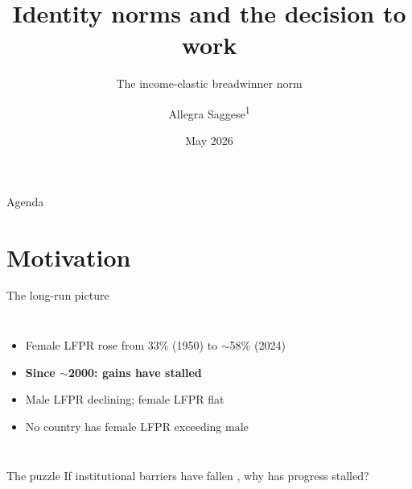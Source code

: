 \documentclass[10pt,aspectratio=169]{beamer}
\title[Identity norms \& work]{Identity norms and the decision to work}
\subtitle{The income-elastic breadwinner norm}
\author[Saggese]{Allegra Saggese\textsuperscript{1}}
\institute{\textsuperscript{1}UC Santa Cruz}
\date[May 2026]{May 2026}
\begin{document}

\maketitle

\begin{frame}[toc]{Agenda}
  \tableofcontents
\end{frame}

\section{Motivation}

\begin{frame}{The long-run picture}
  \begin{columns}[c]
      \begin{itemize}
        \item Female LFPR rose from 33\% (1950) to $\sim$58\% (2024)
        \item \textbf{Since $\sim$2000: gains have stalled}
        \item Male LFPR declining; female LFPR flat
        \item No country has female LFPR exceeding male
              \citep{SaezGethin2026, RameyFrancis2009}
      \end{itemize}
  \end{columns}
  \vspace{0.5em}
  \begin{block}{The puzzle}
    If institutional barriers have fallen \citep{Goldin1992, Goldin2023},
    why has progress stalled?
  \end{block}
\end{frame}
\end{document}
